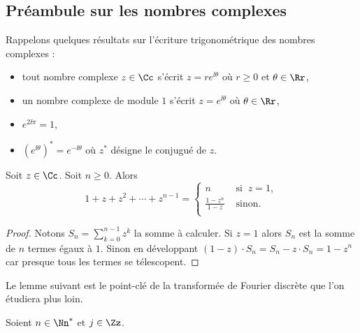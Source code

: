 \documentclass[11pt,class=report,crop=false]{standalone}
\begin{document}
\subsection{Préambule sur les nombres complexes}

Rappelons quelques résultats sur l'écriture trigonométrique des nombres complexes :
\begin{itemize}
  \item tout nombre complexe $z\in\Cc$ s'écrit $z= re^{\ii\theta}$ où $r\ge0$ et $\theta\in\Rr$,
  \item un nombre complexe de module $1$ s'écrit $z= e^{\ii \theta}$ où $\theta\in\Rr$,
  \item $e^{2\ii\pi} = 1$,
  \item $(e^{\ii \theta})^* = e^{-\ii\theta}$ où $z^*$ désigne le conjugué de $z$.
\end{itemize}

\begin{lemme}
\label{lem:geo}
Soit $z \in \Cc$. Soit $n\ge0$.
Alors
$$1+z+z^2+\cdots +z^{n-1} = \left\{ 
\begin{array}{rl}
n & \text{ si } \ z = 1, \\
\frac{1-z^{n}}{1-z} & \text{ sinon.} \\
\end{array}
\right.$$
\end{lemme}

\begin{proof}
Notons $S_n=\sum_{k=0}^{n-1}z^k$ la somme à calculer. 
Si $z=1$ alors $S_n$ est la somme de $n$ termes égaux à $1$.
Sinon en développant $(1-z) \cdot S_n  = S_n - z\cdot S_n = 1-z^{n}$ car presque tous les termes se télescopent.
\end{proof}

Le lemme suivant est le point-clé de la transformée de Fourier discrète que l'on étudiera plus loin.
\begin{lemme}
\label{lem:crucial}
Soient $n\in\Nn^*$ et $j\in\Zz$.

\end{lemme}
\end{document}

